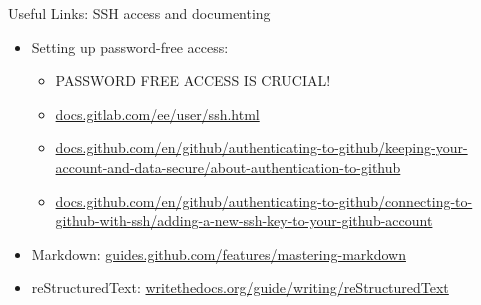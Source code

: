 \documentclass[aspectratio=169]{beamer}
\begin{document}
\begin{frame}
  {Useful Links: SSH access and documenting}
  \begin{itemize}\itemsep.5cm
    \item Setting up password-free access:
      \begin{itemize}
        \item PASSWORD FREE ACCESS IS CRUCIAL!
        \item \href{https://docs.gitlab.com/ee/user/ssh.html}%
        {docs.gitlab.com/ee/user/ssh.html}
        \item \href{https://docs.github.com/en/github/authenticating-to-github/keeping-your-account-and-data-secure/about-authentication-to-github}%
          {docs.github.com/en/github/authenticating-to-github/keeping-your-account-and-data-secure/about-authentication-to-github}
        \item \href{https://docs.github.com/en/github/authenticating-to-github/connecting-to-github-with-ssh/adding-a-new-ssh-key-to-your-github-account}%
        {docs.github.com/en/github/authenticating-to-github/connecting-to-github-with-ssh/adding-a-new-ssh-key-to-your-github-account}
      \end{itemize}
    \item Markdown:
      \href{https://guides.github.com/features/mastering-markdown}%
      {guides.github.com/features/mastering-markdown}
    \item reStructuredText:
      \href{https://www.writethedocs.org/guide/writing/reStructuredText}%
        {writethedocs.org/guide/writing/reStructuredText}
  \end{itemize}
\end{frame}
\end{document}
